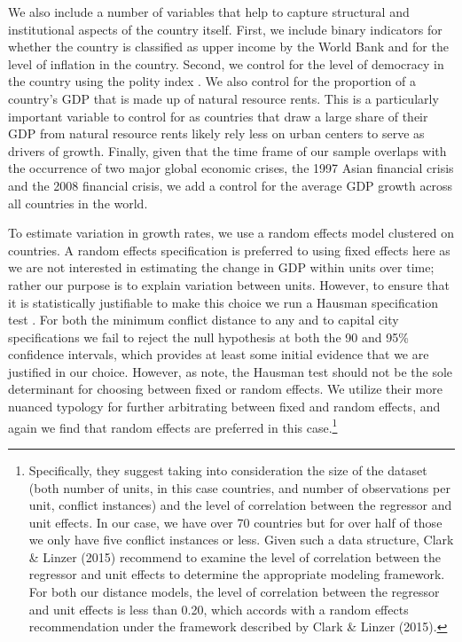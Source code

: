 We also include a number of variables that help to capture structural and institutional aspects of the country itself. First, we include binary indicators for whether the country is classified as upper income by the World Bank and for the level of inflation in the country. Second, we control for the level of democracy in the country using the polity index \citep{marshall:etal:2013}. We also control for the proportion of a country's GDP that is made up of natural resource rents. This is a particularly important variable to control for as countries that draw a large share of their GDP from natural resource rents likely rely less on urban centers to serve as drivers of growth. Finally, given that the time frame of our sample overlaps with the occurrence of two major global economic crises, the 1997 Asian financial crisis and the 2008 financial crisis, we add a control for the average GDP growth across all countries in the world. 

To estimate variation in growth rates, we use a random effects model clustered on countries. A random effects specification is preferred to using fixed effects here as we are not interested in estimating the change in GDP within units over time; rather our purpose is to explain variation between units. However, to ensure that it is statistically justifiable to make this choice we run a Hausman specification test \citep{greene:2008}. For both the minimum conflict distance to any and to capital city specifications we fail to reject the null hypothesis at both the 90 and 95\% confidence intervals, which provides at least some initial evidence that we are justified in our choice. However, as \citet{clark:linzer:2015} note, the Hausman test should not be the sole determinant for choosing between fixed or random effects. We utilize their more nuanced typology for further arbitrating between fixed and random effects, and again we find that random effects are preferred in this case.\footnote{Specifically, they suggest taking into consideration the size of the dataset (both number of units, in this case countries, and number of observations per unit, conflict instances) and the level of correlation between the regressor and unit effects. In our case, we have over 70 countries but for over half of those we only have five conflict instances or less. Given such a data structure, Clark \& Linzer (2015) recommend to examine the level of correlation between the regressor and unit effects to determine the appropriate modeling framework. For both our distance models, the level of correlation between the regressor and unit effects is less than 0.20, which accords with a random effects recommendation under the framework described by Clark \& Linzer (2015).}

